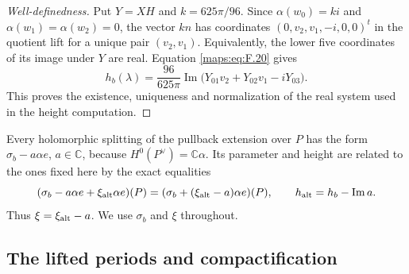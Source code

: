 \begin{proof}[Well-definedness]
Put $Y=XH$ and $k=625\pi/96$. Since
$\alpha(w_0)=ki$ and $\alpha(w_1)=\alpha(w_2)=0$,
the vector $kn$ has coordinates
$(0,v_2,v_1,-i,0,0)^t$ in the quotient lift for a unique
pair $(v_2,v_1)$. Equivalently, the lower five coordinates
of its image under $Y$ are real. Equation
\eqref{maps:eq:F.20} gives
\[
 h_b(\lambda)=\frac{96}{625\pi}
 \operatorname{Im}\bigl(Y_{01}v_2+Y_{02}v_1-iY_{03}\bigr).
\]
This proves the existence, uniqueness and normalization of the
real system used in the height computation.
\end{proof}

\begin{remark}
\hypertarget{tag-PV04}{}\label{rem:V:splitting-change}
Every holomorphic splitting of the pullback extension over $P$
has the form $\sigma_b-a\alpha e$, $a\in\mathbb C$, because
$H^0(P^\vee)=\mathbb C\alpha$. Its parameter and height are
related to the ones fixed here by the exact equalities
\[
 (\sigma_b-a\alpha e+\xi_{\rm alt}\alpha e)(P)
  =(\sigma_b+(\xi_{\rm alt}-a)\alpha e)(P),
 \qquad h_{\rm alt}=h_b-\operatorname{Im}a.
\]
Thus $\xi=\xi_{\rm alt}-a$. We use $\sigma_b$ and $\xi$
throughout.
\end{remark}

\subsection{The lifted periods and compactification}

